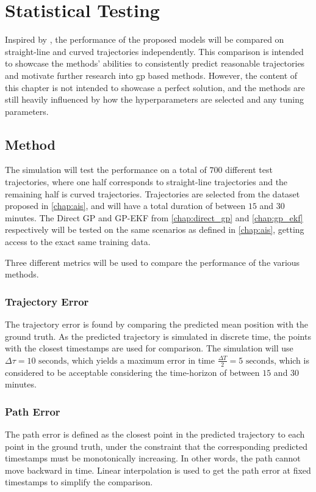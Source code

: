 \chapter{Statistical Testing}\label{chap:stat_testing}
Inspired by \cite{hexeberg}, the performance of the proposed models will be compared on straight-line and curved trajectories independently. This comparison is intended to showcase the methods' abilities to consistently predict reasonable trajectories and motivate further research into \acrshort{gp} based methods. However, the content of this chapter is not intended to showcase a perfect solution, and the methods are still heavily influenced by how the hyperparameters are selected and any tuning parameters.

\section{Method}

The simulation will test the performance on a total of $700$ different test trajectories, where one half corresponds to straight-line trajectories and the remaining half is curved trajectories. Trajectories are selected from the dataset proposed in \cref{chap:ais}, and will have a total duration of between $15$ and $30$ minutes. The Direct GP and GP-EKF from \cref{chap:direct_gp} and \cref{chap:gp_ekf} respectively will be tested on the same scenarios as defined in \cref{chap:ais}, getting access to the exact same training data.

Three different metrics will be used to compare the performance of the various methods.

\subsection{Trajectory Error}
The trajectory error is found by comparing the predicted mean position with the ground truth. As the predicted trajectory is simulated in discrete time, the points with the closest timestamps are used for comparison. The simulation will use $\Delta \tau = 10\text{ seconds}$, which yields a maximum error in time $\frac{\Delta T}{2} = 5 \text{ seconds}$, which is considered to be acceptable considering the time-horizon of between $15$ and $30$ minutes.
\subsection{Path Error}
The path error is defined as the closest point in the predicted trajectory to each point in the ground truth, under the constraint that the corresponding predicted timestamps must be monotonically increasing. In other words, the path cannot move backward in time. Linear interpolation is used to get the path error at fixed timestamps to simplify the comparison.

